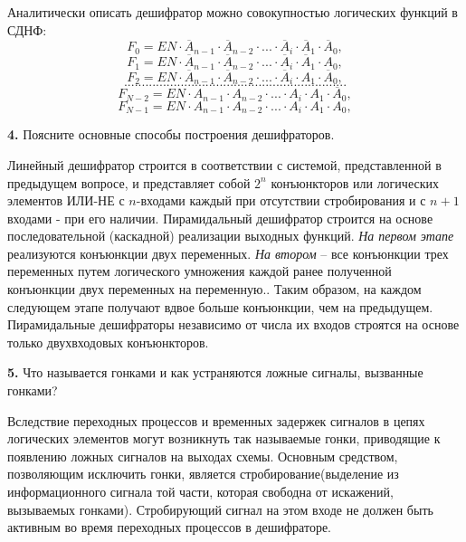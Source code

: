 \documentclass[a4paper,12pt]{article}
\begin{document}
\noindent Аналитически описать дешифратор можно совокупностью логических функций в СДНФ:
$$ F_{0} = EN \cdot \overline{A}_{n - 1}  \cdot \overline{A}_{n - 2}  \cdot ... \cdot \overline{A}_{i} \cdot \overline{A}_{1} \cdot \overline{A}_{0}, $$
$$ F_{1} = EN \cdot \overline{A}_{n - 1}  \cdot \overline{A}_{n - 2}  \cdot ... \cdot \overline{A}_{i} \cdot \overline{A}_{1} \cdot A_{0}, $$
$$ F_{2} = EN \cdot \overline{A}_{n - 1}  \cdot \overline{A}_{n - 2}  \cdot ... \cdot \overline{A}_{i} \cdot A_{1} \cdot \overline{A}_{0}, $$
$$. . . . . . . . . . . . . . . . . . . . . . . . . . . . . . . . . . . . . . . . . . . . . . . . . . . . . . . . . . . . . . .$$
$$ F_{N - 2} = EN \cdot A_{n - 1}  \cdot A_{n - 2}  \cdot ... \cdot A_{i} \cdot A_{1} \cdot \overline{A}_{0}, $$
$$ F_{N - 1} = EN \cdot A_{n - 1}  \cdot A_{n - 2}  \cdot ... \cdot A_{i} \cdot A_{1} \cdot A_{0}, $$

\clearpage
\noindent\textbf{4.} Поясните основные способы построения дешифраторов.\newline

\noindent Линейный дешифратор строится в соответствии с системой, представленной в предыдущем вопросе, и представляет собой $2^n$ конъюнкторов или логических элементов ИЛИ-НЕ с $n$-входами каждый при отсутствии стробирования и с $n + 1$ входами - при его наличии. \newline
Пирамидальный дешифратор строится на основе последовательной (каскадной) реализации выходных функций. \textit{На первом этапе} реализуются конъюнкции двух переменных. \textit{На втором} – все конъюнкции трех переменных путем логического умножения каждой ранее полученной конъюнкции двух переменных на переменную.. Таким образом, на каждом следующем этапе получают вдвое больше конъюнкции, чем на предыдущем. Пирамидальные дешифраторы независимо от числа их входов строятся на основе только двухвходовых конъюнкторов.
\newline

\noindent\textbf{5.} Что называется гонками и как устраняются ложные сигналы, вызванные гонками?\newline

\noindent Вследствие переходных процессов и временных задержек сигналов в цепях логических элементов могут возникнуть так называемые гонки, приводящие к появлению ложных сигналов на выходах схемы. Основным средством, позволяющим исключить гонки, является стробирование(выделение из информационного сигнала той части, которая  свободна от искажений, вызываемых гонками). Стробирующий сигнал на этом входе не должен быть активным во время переходных процессов в дешифраторе.
\newline
\end{document}
